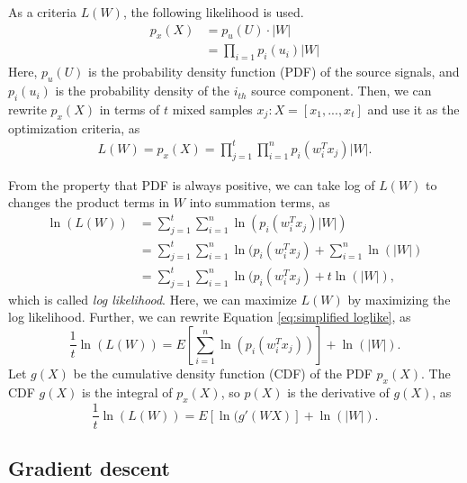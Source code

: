 \documentclass[conference]{IEEEtran}
\begin{document}
As a criteria  $L(W)$, the following likelihood is used.
\begin{equation}
\begin{aligned}
     p_x(X) &= p_u(U)\cdot|W| \\
    & = \prod_{i=1}p_i(u_i)|W|    
\end{aligned}
\end{equation}
Here, $p_u(U)$ is the probability density function (PDF) of the source signals, and $p_i(u_i)$ is the probability density of the $i_{th}$ source component.
Then, we can rewrite $p_x(X)$ in terms of $t$ mixed samples $x_j: X= \left[x_1, ... , x_t \right]$ and use it as the optimization criteria, as
\begin{equation}
\begin{aligned}
    L(W) = p_x(X) =  \prod_{j=1}^t\prod_{i=1}^np_i(w_i^Tx_j)|W|.
    \label{eq:likelihood def}
\end{aligned}
\end{equation}

From the property that PDF is always positive, we can take log of $L(W)$ to changes the product terms in $W$ into summation terms, as
\begin{equation}
\begin{aligned}
    \ln{(L(W))} 
     &= \sum_{j=1}^t\sum_{i=1}^n\ln{(p_i(w_i^Tx_j)|W|)}\\
     &= \sum_{j=1}^t\sum_{i=1}^n\ln{(p_i(w_i^Tx_j)} + \sum_{i=1}^n\ln(|W|)\\
     &= \sum_{j=1}^t\sum_{i=1}^n\ln{(p_i(w_i^Tx_j)} + t\ln{(|W|)},
     \label{eq:simplified loglike}
\end{aligned}
\end{equation}
which is called {\it log likelihood}. Here, we can maximize $L(W)$ by maximizing the log likelihood. Further, we can rewrite Equation \ref{eq:simplified loglike}, as
\begin{equation}
    \frac{1}{t}\ln{(L(W))} = E\left[\sum_{i=1}^n\ln{(p_i(w_i^Tx_j))}\right] + \ln{(|W|)}.
    \label{eq:log-like-Exp}
\end{equation}
Let $g(X)$ be the cumulative density function (CDF) of the PDF $p_x(X)$.
The CDF $g(X)$ is the integral of $p_x(X)$, so $p(X)$ is the derivative of $g(X)$, as
\begin{equation}
    \frac{1}{t}\ln{(L(W))} = E\left[\ln{(g'(WX)}\right] + \ln{(|W|)}.
    \label{eq:log-like-Exp-cdf} 
\end{equation}


\subsection{Gradient descent}
\end{document}
